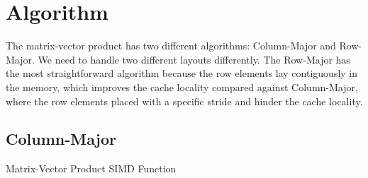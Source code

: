 \section{Algorithm}
The matrix-vector product has two different algorithms: 
Column-Major and Row-Major. We need to handle two different 
layouts differently. 
The Row-Major has the most straightforward algorithm because 
the row elements lay contiguously in the memory, which improves 
the cache locality compared against Column-Major, where the row 
elements placed with a specific stride and hinder the cache locality.

\subsection{Column-Major}

\begin{algorithm}[H]
    \SetAlgoLined

    \caption{Matrix-Vector Product SIMD Function}
\end{algorithm}

